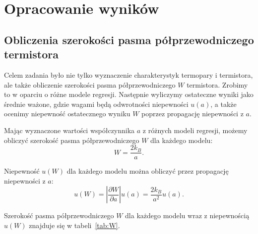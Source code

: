 \documentclass[12pt, a4paper]{article}
\begin{document}
\section{Opracowanie wyników}
\subsection{Obliczenia szerokości pasma półprzewodniczego termistora}
Celem zadania było nie tylko wyznaczenie charakterystyk termopary i termistora,
ale także obliczenie szerokości pasma półprzewodniczego $W$ termistora. Zrobimy
to w oparciu o różne modele regresji. Następnie wyliczymy ostateczne wyniki
jako średnie ważone, gdzie wagami będą odwrotności niepewności $u(a)$, a także
ocenimy niepewność ostatecznego wyniku $W$ poprzez propagację niepewności z
$a$.

Mając wyznaczone wartości współczynnika $a$ z różnych modeli regresji, możemy
obliczyć szerokość pasma półprzewodniczego $W$ dla każdego modelu:
\begin{equation}
    W = \frac{2k_B}{a}.
\end{equation}

Niepewność $u(W)$ dla każdego modelu można obliczyć przez propagację
niepewności z $a$:
\begin{equation}
    u(W) = \left| \frac{\partial W}{\partial a} \right| u(a) = \frac{2k_B}{a^2} u(a).
\end{equation}

Szerokość pasma półprzewodniczego $W$ dla każdego modelu wraz z niepewnością
$u(W)$ znajduje się w tabeli~\ref{tab:W}.
\end{document}
